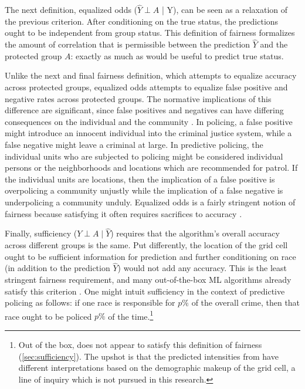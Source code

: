 The next definition, equalized odds ($\hat{Y} \perp A$ | Y), can be seen as a relaxation of the previous criterion. After conditioning on the true status, the predictions ought to be independent from group status. This definition of fairness formalizes the amount of correlation that is permissible between the prediction $\hat{Y}$ and the protected group $A$: exactly as much as would be useful to predict true status.

Unlike the next and final fairness definition, which attempts to equalize accuracy across protected groups, equalized odds attempts to equalize false positive and negative rates across protected groups. The normative implications of this difference are significant, since false positives and negatives can have differing consequences on the individual and the community \citep{narayanan_21_2018}. In policing, a false positive might introduce an innocent individual into the criminal justice system, while a false negative might leave a criminal at large. In predictive policing, the individual units who are subjected to policing might be considered individual persons or the neighborhoods and locations which are recommended for patrol. If the individual units are locations, then the implication of a false positive is overpolicing a community unjustly while the implication of a false negative is underpolicing a community unduly. Equalized odds is a fairly stringent notion of fairness because satisfying it often requires sacrifices to accuracy \citep{hardt_equality_2016}.

Finally, sufficiency ($Y \perp A \mid \hat{Y}$) requires that the algorithm's overall accuracy across different groups is the same. Put differently, the location of the grid cell ought to be sufficient information for prediction and further conditioning on race (in addition to the prediction $\hat{Y}$) would not add any accuracy. This is the least stringent fairness requirement, and many out-of-the-box ML algorithms already satisfy this criterion \citep{barocas_fairness_2018}. One might intuit sufficiency in the context of predictive policing as follows: if one race is responsible for $p\%$ of the overall crime, then that race ought to be policed $p\%$ of the time.\footnote{Out of the box, \pp does not appear to satisfy this definition of fairness (\autoref{sec:sufficiency}). The upshot is that the predicted intensities from \pp have different interpretations based on the demographic makeup of the grid cell, a line of inquiry which is not pursued in this research.}

